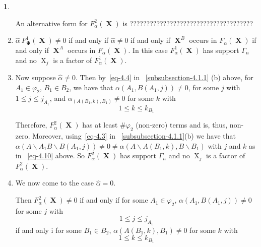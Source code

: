 \documentclass[a4paper,12pt]{article}
\DeclareMathOperator{\x}{\mathrm{X}}
\theoremstyle{definition}
\theoremstyle{underlinethm}
\theoremstyle{definition}
\newtheorem{subsubsec}{}[subsection]
\begin{document}
\begin{subsubsec}
\begin{enumerate}[label=(\alph*)]
An alternative form for $F_{\alpha}^{2} (\boldsymbol{\x})$ is ?????????????????????????????????????


\item $\hat{\alpha}~ F_{\boldsymbol{\Psi}}^{1} (\boldsymbol{\x}) \neq 0$ if and only if $\hat{\alpha} \neq 0$ if and only if $\boldsymbol{\x}^{B}$ occurs in $F_{\alpha}(\boldsymbol{\x})$ if and only if $\boldsymbol{\x}^{A}$ occurs in $F_{\alpha}(\boldsymbol{\x})$. In this case $F_{\alpha}^{1}(\boldsymbol{\x})$ has support $\Gamma_{n}$ and no $\x_{j}$ is a factor of $F_{\alpha}^{1}(\boldsymbol{\x})$.


\item Now suppose $\hat{\alpha} \neq 0$. Then by~\eqref{eq-4.4} in ~\eqref{subsubsection-4.1.1} (b) above, for $A_{1} \in \varphi_{2}$, $B_{1} \in B_{2}$, we have that $\alpha(A_{1}, B(A_{1}, j)) \neq 0$, for some $j$ with $1 \leq j \leq j_{A_{1}}$, and $\alpha_{(A(B_{1}, k), B_{1})} \neq 0$ for some $k$ with 
\begin{equation}
1 \leq k \leq k_{B_{1}}\tag{4.10}\label{eq-4.10} 
\end{equation}

Therefore, $F_{\alpha}^{2}(\boldsymbol{\x})$ has at least $\# \varphi_{2}$ (non-zero) terms and is, thus, non-zero. Moreover, using~\eqref{eq-4.3} in ~\eqref{subsubsection-4.1.1}(b) we have that $\alpha\left(A \smallsetminus A_{1} B\smallsetminus B (A_{1}, j) \right) \neq 0 \neq \alpha \left(A\smallsetminus A (B_{1}, k), B \smallsetminus B_{1} \right)$ with $j$ and $k$ as in ~\eqref{eq-4.10} above. So $F_{\alpha}^{2}(\boldsymbol{\x})$ has support $\Gamma_{n}$ and no $\x_{j}$ is a factor of $F_{\alpha}^{2}(\boldsymbol{\x})$.

\item We now come to the case $\hat{\alpha}=0$.

Then $F_{\alpha}^{2} (\boldsymbol{\x}) \neq 0$ if and only if for some $A_{1} \in \varphi_{2}$, $\alpha\left(A_{1}, B(A_{1}, j)\right)\neq 0$ for some $j$ with
\begin{equation}
1 \leq j \leq j_{A_{1}}\tag{4.11}\label{eq-4.11}
\end{equation}
if and only i for some $B_{1} \in B_{2}$, $\alpha\left(A(B_{1}, k), B_{1}\right)  \neq 0 $ for some $k$ with
\begin{equation}
1 \leq k \leq k_{B_{1}}\tag{4.12}\label{eq-4.12}
\end{equation}


\end{enumerate}
\end{subsubsec}
\end{document}

